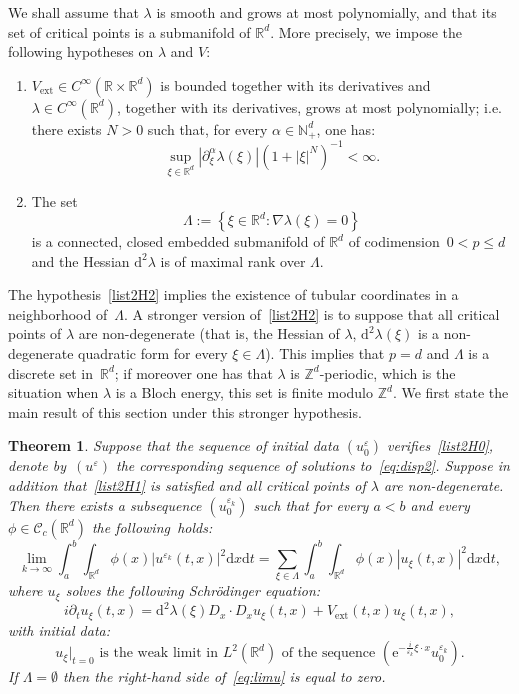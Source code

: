 \documentclass[10pt]{amsart}
\newtheorem{theo}[cdrthm]{Theorem}
\theoremstyle{definition}
\DeclareMathOperator{\ext}{ext}
\newcommand*\R{{\mathbb R}}
\newcommand*\N{{\mathbb N}}
\newcommand*\Z{{\mathbb Z}}
\newcommand*\eps{\varepsilon}
\numberwithin{equation}{section}
\newcommand{\ee}{{\mathrm e}}
\newcommand*{\Henumi}{\renewcommand*{\theenumi}{{H\arabic{enumi}}}}
\newcommand*{\dd}{\mathrm{d}}
\newcommand*{\dt}{\dd t}
\newcommand*{\dx}{\dd x}
\begin{document}
We shall assume that $\lambda$ is smooth and grows at most polynomially, and that its set of critical points is a submanifold of $\R^d$. More precisely, we impose the following hypotheses on $\lambda$ and $V$:
\begin{enumerate}\Henumi
\item \label{list2H1} $V_{\ext}\in C^\infty(\R\times\R^d)$ is bounded together with its derivatives and $\lambda\in C^\infty(\R^d)$, together with its derivatives, grows at most polynomially; i.e. there exists $N>0$ such that, for every $\alpha\in\N^d_+$, one has:
\[
\sup_{\xi\in\R^d}\left|\partial_\xi^\alpha\lambda(\xi)\right|(1+|\xi|^N)^{-1}<\infty.
\]
\item \label{list2H2} The set
\[
\Lambda := \left\lbrace \xi \in \R^d : \nabla\lambda(\xi) = 0 \right\rbrace
\]
is a connected, closed embedded submanifold of $\R^d$ of codimension~$0<p\leq d$ and the Hessian $\dd^2\lambda$ is of maximal rank over $\Lambda$.
\end{enumerate}

The hypothesis~\eqref{list2H2} implies the existence of tubular coordinates in a neighborhood of~$\Lambda$. A stronger version of~\eqref{list2H2} is to suppose that all critical points of $\lambda$ are non-degenerate (that is, the Hessian of $\lambda$, $\dd^2\lambda(\xi)$ is a non-degenerate quadratic form for every $\xi\in\Lambda$). This implies that $p=d$ and $\Lambda$ is a discrete set in~$\R^d$; if moreover one has that $\lambda$ is $\Z^d$-periodic, which is the situation when $\lambda$ is a Bloch energy, this set is finite modulo $\Z^d$. We first state the main result of this section under this stronger hypothesis.

\begin{theo}\label{theo:disc}
Suppose that the sequence of initial data $(u^\eps_0)$ verifies~\eqref{list2H0}, denote by~$(u^\eps)$ the corresponding sequence of solutions to~\eqref{eq:disp2}. Suppose in addition that~\eqref{list2H1} is satisfied and all critical points of $\lambda$ are non-degenerate. Then there exists a subsequence $(u^{\eps_k}_0)$ such that for every $a<b$ and every $\phi\in \mathcal{C}_c(\R^d)$ the following~holds:
\begin{equation}\label{eq:limu}
\lim_{k\to\infty}\int_a^b\int_{\R^d}\phi(x)|u^{\eps_k}(t,x)|^2\dx\dt=\sum_{\xi\in \Lambda}\int_a^b\int_{\R^d}\phi(x)|u_\xi (t,x)|^2\dx\dt,
\end{equation}
where $u_\xi$ solves the following Schr\"odinger equation:
\begin{equation}\label{eq:schrohprofil}
i\partial_t u_\xi(t,x) =\dd^2\lambda(\xi)D_x\cdot D_x u_\xi(t,x) +V_{\ext}(t,x)u_\xi(t,x),
\end{equation}
with initial data:
\[
u_\xi|_{t=0} \text{ is the weak limit in } L^2(\R^d) \text{ of the sequence } \left({\ee}^{-\frac{i}{\eps_k} \xi \cdot x} u^{\eps_k}_0\right).
\]
If $\Lambda=\emptyset$ then the right-hand side of~\eqref{eq:limu} is equal to zero.
\end{theo}
\end{document}
